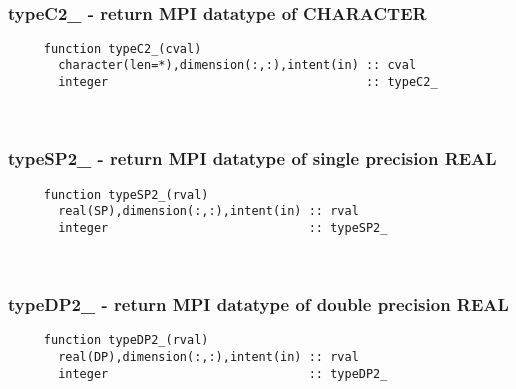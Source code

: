  
\mbox{}\hrulefill\ 

  \subsubsection{typeC2\_ - return MPI datatype of CHARACTER}

\begin{verbatim} 
     function typeC2_(cval)
       character(len=*),dimension(:,:),intent(in) :: cval
       integer                                    :: typeC2_
 \end{verbatim}%
 
 
\mbox{}\hrulefill\ 
 
  \subsubsection{typeSP2\_ - return MPI datatype of single precision REAL}

\begin{verbatim} 
     function typeSP2_(rval)
       real(SP),dimension(:,:),intent(in) :: rval
       integer                            :: typeSP2_
 \end{verbatim}%
 
 
\mbox{}\hrulefill\ 
 
  \subsubsection{typeDP2\_ - return MPI datatype of double precision REAL}

\begin{verbatim} 
     function typeDP2_(rval)
       real(DP),dimension(:,:),intent(in) :: rval
       integer                            :: typeDP2_
 \end{verbatim}%
 
